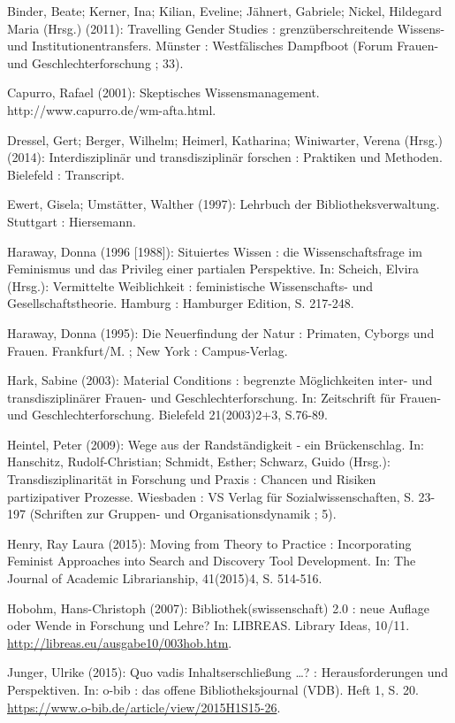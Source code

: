 Binder, Beate; Kerner, Ina; Kilian, Eveline; Jähnert, Gabriele; Nickel,
Hildegard Maria (Hrsg.) (2011): Travelling Gender Studies :
grenzüberschreitende Wissens- und Institutionentransfers. Münster :
Westfälisches Dampfboot (Forum Frauen- und Geschlechterforschung ; 33).

Capurro, Rafael (2001): Skeptisches Wissensmanagement.
http://www.capurro.de/wm-afta.html.

Dressel, Gert; Berger, Wilhelm; Heimerl, Katharina; Winiwarter, Verena
(Hrsg.) (2014): Interdisziplinär und transdisziplinär forschen :
Praktiken und Methoden. Bielefeld : Transcript.

Ewert, Gisela; Umstätter, Walther (1997): Lehrbuch der
Bibliotheksverwaltung. Stuttgart : Hiersemann.

Haraway, Donna (1996 {[}1988{]}): Situiertes Wissen : die
Wissenschaftsfrage im Feminismus und das Privileg einer partialen
Perspektive. In: Scheich, Elvira (Hrsg.): Vermittelte Weiblichkeit :
feministische Wissenschafts- und Gesellschaftstheorie. Hamburg :
Hamburger Edition, S. 217-248.

Haraway, Donna (1995): Die Neuerfindung der Natur : Primaten, Cyborgs
und Frauen. Frankfurt/M. ; New York : Campus-Verlag.

Hark, Sabine (2003): Material Conditions : begrenzte Möglichkeiten
inter- und transdisziplinärer Frauen- und Geschlechterforschung. In:
Zeitschrift für Frauen- und Geschlechterforschung. Bielefeld
21(2003)2+3, S.76-89.

Heintel, Peter (2009): Wege aus der Randständigkeit - ein Brückenschlag.
In: Hanschitz, Rudolf-Christian; Schmidt, Esther; Schwarz, Guido
(Hrsg.): Transdisziplinarität in Forschung und Praxis : Chancen und
Risiken partizipativer Prozesse. Wiesbaden : VS Verlag für
Sozialwissenschaften, S. 23-197 (Schriften zur Gruppen- und
Organisationsdynamik ; 5).

Henry, Ray Laura (2015): Moving from Theory to Practice : Incorporating
Feminist Approaches into Search and Discovery Tool Development. In: The
Journal of Academic Librarianship, 41(2015)4, S. 514-516.

Hobohm, Hans-Christoph (2007): Bibliothek(swissenschaft) 2.0 : neue
Auflage oder Wende in Forschung und Lehre? In: LIBREAS. Library Ideas,
10/11. \url{http://libreas.eu/ausgabe10/003hob.htm}.

Junger, Ulrike (2015): Quo vadis Inhaltserschließung \ldots{}? :
Herausforderungen und Perspektiven. In: o-bib : das offene
Bibliotheksjournal (VDB). Heft 1, S. 20.
\url{https://www.o-bib.de/article/view/2015H1S15-26}.

